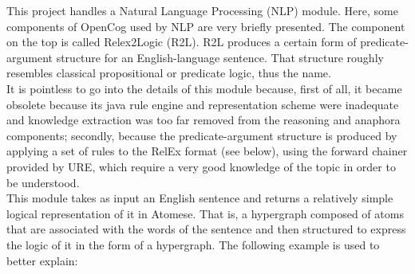 This project handles a Natural Language Processing (NLP) module. Here, some components of OpenCog used by NLP are very briefly presented. 
The component on the top is called Relex2Logic (R2L). 
R2L produces a certain form of predicate-argument structure for an English-language sentence. That structure roughly resembles classical propositional or predicate logic, thus the name. \\
It is pointless to go into the details of this module because, first of all, it became obsolete because its java rule engine and representation scheme were inadequate and knowledge extraction was too far removed from the reasoning and anaphora components; secondly, because the predicate-argument structure is produced by applying a set of rules to the RelEx format (see below), using the forward chainer provided by URE, which require a very good knowledge of the topic in order to be understood. \\
This module takes as input an English sentence and returns a relatively simple logical representation of it in Atomese. That is, a hypergraph composed of atoms that are associated with the words of the sentence and then structured to express the logic of it in the form of a hypergraph. The following example is used to better explain: \\
